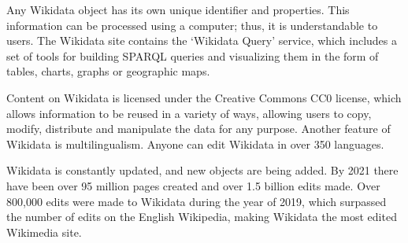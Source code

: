 Any Wikidata object has its own unique identifier and properties. This information can be processed using a computer; thus, it is understandable to users. The Wikidata site contains the ‘Wikidata Query’ service, which includes a set of tools for building SPARQL queries and visualizing them in the form of tables, charts, graphs or geographic maps.

Content on Wikidata is licensed under the Creative Commons CC0 license, which allows information to be reused in a variety of ways, allowing users to copy, modify, distribute and manipulate the data for any purpose. Another feature of Wikidata is multilingualism. Anyone can edit Wikidata in over 350 languages.

Wikidata is constantly updated, and new objects are being added. By 2021 there have been over 95 million pages created and over 1.5 billion edits made. Over 800,000 edits were made to Wikidata during the year of 2019, which surpassed the number of edits on the English Wikipedia, making Wikidata the most edited Wikimedia site.
